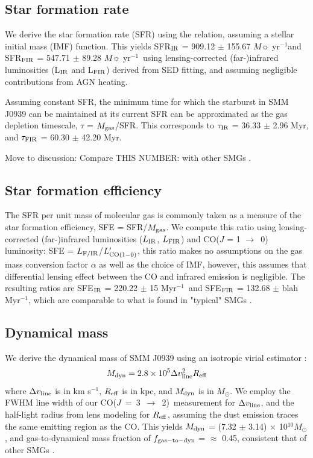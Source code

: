 \documentclass[twocolumn,apj,numberedappendix]{emulateapj}
\newcommand{\Msun}{\mbox{$M_{\odot}$}}
\newcommand{\rarr}{$\rightarrow$}
\newcommand{\CO}{\mbox{CO($J$ = 3 $\rightarrow$ 2) }}
\newcommand{\Lp}{\mbox{$L^{\prime}_{\rm CO(1-0)}$}}
\newcommand{\eg}{{\sl e.g.,~}}
\newcommand{\pmOne}{$^{-1}$}
\begin{document}
\subsection{Star formation rate}
We derive the star formation rate (SFR) using the \citet{Kennicutt98a} relation, assuming a \citet{Chabrier03a}
stellar initial mass (IMF) function. This yields SFR$_{\rm IR}$ 
= 909.12 $\pm$ 155.67 $M\sun$ yr\pmOne and SFR$_{\rm FIR}$ = 547.71 $\pm$ 89.28 $M
\sun$ yr\pmOne\ using lensing-corrected (far-)infrared luminosities (L$_{\rm IR}$ and L$_{\rm FIR}$) derived from SED 
fitting, and assuming negligible contributions from AGN heating.

Assuming constant SFR, the minimum time for which the starburst in SMM J0939 can be maintained at its
current SFR can be approximated as the gas depletion timescale, $\tau$ = $M_{\rm gas}$/SFR. 
This corresponds to $\tau_{\rm IR}$ = 36.33 $\pm$ 2.96 Myr, and $\tau_{\rm FIR}$ = 60.30 $\pm$ 42.20 Myr.

Move to discussion: Compare THIS NUMBER: with other SMGs \citep[\eg][]{Greve05a}. 

\subsection{Star formation efficiency}
The SFR per unit mass of molecular gas is commonly taken as a
measure of the star formation efficiency, SFE = SFR/$M_{\rm gas}$. We compute this ratio using lensing-corrected (far-)infrared 
luminosities ($L_{\rm IR}$, $L_{\rm FIR}$) and CO($J$ = 1 \rarr\ 0) luminosity: SFE = $L_{\rm F/IR}$/\Lp, this ratio makes no assumptions on the gas mass conversion factor $\alpha$ as well as the 
choice of IMF, however, this assumes that differential lensing effect between the CO and infrared emission is negligible. 
The resulting ratios are SFE$_{\rm IR}$ = 220.22 $\pm$ 15 Myr\pmOne\ and SFE$_{\rm FIR}$ = 132.68 $\pm$ blah Myr\pmOne, which are comparable
to what is found in "typical" SMGs \citep{Riechers10, Tacconi06, Greve05a}.

\subsection{Dynamical mass} 
We derive the dynamical mass of SMM J0939 using an isotropic virial estimator \citep[\eg][]{Engel10a}:
\begin{equation}
M_{\rm dyn} = 2.8\times 10^5\Delta v_{\rm line}^ 2 R_{\rm eff}
\end{equation}
where $\Delta v_{\rm line}$ is in km s\pmOne, $R_{\rm eff}$ is in kpc, and $M_{\rm dyn}$ is in \Msun.
We employ the FWHM line width of our \CO measurement for $\Delta v_{\rm line}$,
and the half-light radius from lens modeling for $R_{\rm eff}$, assuming the dust emission traces the same emitting region as the CO. This yields $M_{\rm dyn}$ = (7.32 $\pm$ 3.14) $\times$ 10$^{10}$\Msun , and gas-to-dynamical mass fraction of $f_{\rm gas-to-dyn}$ = $\approx$ 0.45, consistent that of other SMGs \citep{Greve06a,Tacconi06a}.
\end{document}

